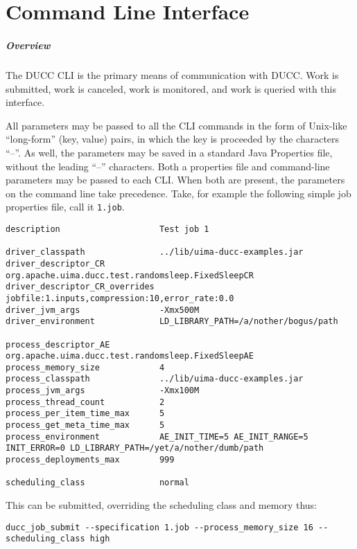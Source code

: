 \ifpdf
\else
{}
\fi
\chapter{Command Line Interface}
\label{chap:cli}

    \paragraph{Overview}
    The DUCC CLI is the primary means of communication with DUCC.  Work is submitted, work is
    canceled, work is monitored, and work is queried with this interface.

    All parameters may be passed to all the CLI commands in the form of Unix-like ``long-form''
    (key, value) pairs, in which the key is proceeded by the characters ``--''.  As well, the
    parameters may be saved in a standard Java Properties file, without the leading ``--''
    characters.  Both a properties file and command-line parameters may be passed to each CLI.  When
    both are present, the parameters on the command line take precedence.  Take, for example
    the following simple job properties file, call it {\tt 1.job}.
\begin{verbatim}
description                    Test job 1

driver_classpath               ../lib/uima-ducc-examples.jar
driver_descriptor_CR           org.apache.uima.ducc.test.randomsleep.FixedSleepCR
driver_descriptor_CR_overrides jobfile:1.inputs,compression:10,error_rate:0.0
driver_jvm_args                -Xmx500M
driver_environment             LD_LIBRARY_PATH=/a/nother/bogus/path

process_descriptor_AE          org.apache.uima.ducc.test.randomsleep.FixedSleepAE
process_memory_size            4
process_classpath              ../lib/uima-ducc-examples.jar
process_jvm_args               -Xmx100M 
process_thread_count           2
process_per_item_time_max      5
process_get_meta_time_max      5
process_environment            AE_INIT_TIME=5 AE_INIT_RANGE=5 INIT_ERROR=0 LD_LIBRARY_PATH=/yet/a/nother/dumb/path
process_deployments_max        999

scheduling_class               normal
\end{verbatim}

    This can be submitted, overriding the scheduling class and memory thus:
\begin{verbatim}
ducc_job_submit --specification 1.job --process_memory_size 16 --scheduling_class high
\end{verbatim}    

